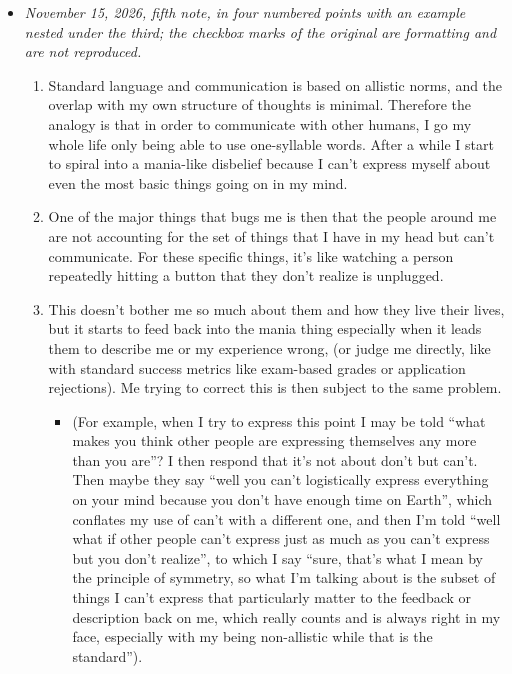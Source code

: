 \begin{itemize}
\item \emph{November 15, 2026, fifth note, in four numbered points with an example nested under the third; the checkbox marks of the original are formatting and are not reproduced.}
\begin{enumerate}
\item Standard language and communication is based on allistic norms, and the overlap with my own structure of thoughts is minimal. Therefore the analogy is that in order to communicate with other humans, I go my whole life only being able to use one-syllable words. After a while I start to spiral into a mania-like disbelief because I can't express myself about even the most basic things going on in my mind.
\item One of the major things that bugs me is then that the people around me are not accounting for the set of things that I have in my head but can't communicate. For these specific things, it's like watching a person repeatedly hitting a button that they don't realize is unplugged.
\item This doesn't bother me so much about them and how they live their lives, but it starts to feed back into the mania thing especially when it leads them to describe me or my experience wrong, (or judge me directly, like with standard success metrics like exam-based grades or application rejections). Me trying to correct this is then subject to the same problem.
\begin{itemize}
\item[---] (For example, when I try to express this point I may be told ``what makes you think other people are expressing themselves any more than you are''? I then respond that it's not about don't but can't. Then maybe they say ``well you can't logistically express everything on your mind because you don't have enough time on Earth'', which conflates my use of can't with a different one, and then I'm told ``well what if other people can't express just as much as you can't express but you don't realize'', to which I say ``sure, that's what I mean by the principle of symmetry, so what I'm talking about is the subset of things I can't express that particularly matter to the feedback or description back on me, which really counts and is always right in my face, especially with my being non-allistic while that is the standard'').
\end{itemize}

\end{enumerate}
\end{itemize}
